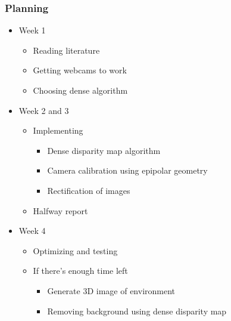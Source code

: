 \documentclass{beamer}
\begin{document}
\frame
{
  \frametitle{Planning}
  \begin{itemize}
    \item Week 1
      \begin{itemize}
        \item Reading literature
        \item Getting webcams to work
        \item Choosing dense algorithm
      \end{itemize}
    \item Week 2 and 3
      \begin{itemize}
        \item Implementing
          \begin{itemize}
            \item Dense disparity map algorithm
            \item Camera calibration using epipolar geometry
            \item Rectification of images
          \end{itemize}
        \item Halfway report
      \end{itemize}
    \item Week 4
      \begin{itemize}
        \item Optimizing and testing
        \item If there's enough time left
          \begin{itemize}
            \item Generate 3D image of environment
            \item Removing background using dense disparity map
          \end{itemize}
      \end{itemize}
  \end{itemize}
}
\end{document}
